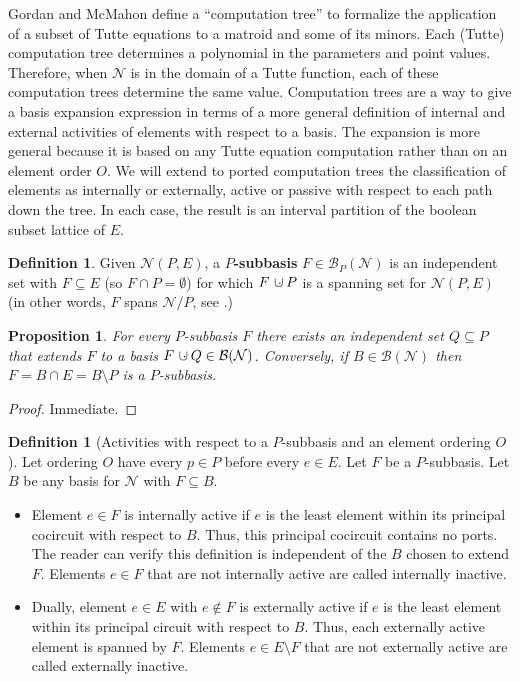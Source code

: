 \documentclass[12pt]{article}
\newtheorem{proposition}[theorem]{Proposition}
\theoremstyle{definition}
\newtheorem{definition}[theorem]{Definition}
\newcommand{\dunion}
{\mbox{\hbox{\hskip6pt$\cdot$\hskip-5.50pt$\cup$\hskip2pt}}}
\begin{document}
Gordan and McMahon define\cite{GordonMcMachonGreedoid} 
a ``computation tree''
to formalize the application of a subset of Tutte equations
to a matroid and some of its minors.
Each (Tutte) computation
tree determines
a polynomial in the parameters and point values.
Therefore, when
$\mathcal{N}$ is in the domain of a Tutte function, each
of these computation trees determine the same value.  
Computation
trees are a way to give
a basis expansion expression in terms of 
a more 
general definition 
of internal and external activities of elements
with respect to a basis.  The expansion is more general because it
is based on any Tutte equation computation rather than on an element order $O$.
We will extend to ported computation trees the
classification\cite{GordonMcMachonGreedoid} of elements as internally or externally, 
active or passive
with respect to each path down the tree.
In each case, the result is an interval
partition of the boolean subset lattice of $E$.  

\begin{definition}
Given $\mathcal{N}(P,E)$,  a
\textbf{$P$-subbasis} $F\in \mathcal{B}_P(\mathcal{N})$
is an independent set  with $F\subseteq E$
(so $F\cap P=\emptyset$) for which $F\dunion P$ is a spanning set
for $\mathcal{N}(P,E)$ (in other words, $F$ spans $\mathcal{N}/P$,
see \cite{SetPointedLV}.)
\end{definition}

\begin{proposition}
For every $P$-subbasis $F$ there exists an independent set $Q\subseteq P$
that extends $F$ to a basis $F\dunion Q\in \mathcal{B}(\mathcal{N})$.
Conversely, if $B\in\mathcal{B}(\mathcal{N})$ then $F=B\cap E=B\setminus P$
is a $P$-subbasis.
\end{proposition}

\begin{proof} Immediate. \end{proof}

\begin{definition}[Activities with respect to a $P$-subbasis and an element
ordering $O$]
Let ordering $O$ have every $p\in P$ before every
$e\in E$.  Let $F$ be a $P$-subbasis.  Let $B$ be any basis for 
$\mathcal{N}$ with $F\subseteq B$.
\begin{itemize}
\item Element $e\in F$
is internally active if $e$ is the least element
within its principal cocircuit with respect to $B$.  Thus, this principal
cocircuit contains no ports.  The reader can verify this definition is 
independent of the $B$ chosen to extend $F$.  Elements $e\in F$ that are
not internally active are called internally inactive.
\item Dually, element $e\in E$ with $e\not\in F$ is externally 
active if $e$ is the least element within its principal circuit with
respect to $B$.  Thus, each externally active element is spanned by 
$F$.  Elements $e\in E\setminus F$ that are not externally active
are called externally inactive.
\end{itemize}
\end{definition}
\end{document}
